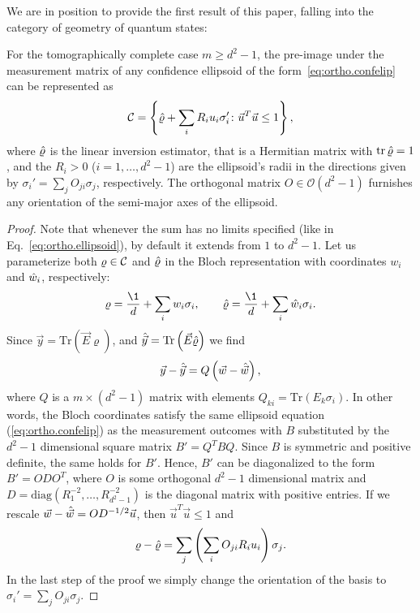 We are in position to provide the first result of this paper, falling into the category of geometry of quantum states:
\begin{theorem}\label{thm:ortho.ellipsoids}
  For the tomographically complete case $m \geq d^2 - 1$, the pre-image under the measurement matrix of any confidence ellipsoid of the form~\eqref{eq:ortho.confelip} can be represented as
  \begin{equation}
    \mathcal{C} = \left\{ \hat{\varrho} + \sum_{i}R_{i}u_{i}\sigma_{i}'\colon \vec{u}^{T}\vec{u}\leq1 \right\},
    \label{eq:ortho.ellipsoid}
  \end{equation}
  where $\hat{\varrho}$ is the linear inversion estimator, that is a Hermitian matrix with $\operatorname{tr} \hat{\varrho} = 1$, and the $R_{i}>0$ ($i=1,\ldots,d^{2}-1$) are the ellipsoid's radii in the directions given by $\sigma_{i}'=\sum_{j}O_{ji}\sigma_{j}$, respectively.
  The orthogonal matrix $O\in\mathcal{O}\left(d^{2}-1\right)$ furnishes any orientation of the semi-major axes of the ellipsoid.
\end{theorem}
\begin{proof}
  Note that whenever the sum has no limits specified (like in Eq.~\eqref{eq:ortho.ellipsoid}), by default it extends from $1$ to $d^{2}-1$.
  Let us parameterize both $\varrho \in \mathcal{C}$ and $\hat{\varrho}$ in the Bloch representation with coordinates $w_{i}$ and $\hat{w}_i$, respectively:
  \begin{equation}
    \varrho=\frac{\1}{d}+\sum_{i}w_{i}\sigma_{i},\qquad\estim{\varrho}=\frac{\1}{d}+\sum_{i}\estim{w}_{i}\sigma_{i}.
  \end{equation}
  Since $\vec{y}=\textrm{Tr}\left(\vec{E}\varrho\right)$, and $\hat{\vec{y}}=\textrm{Tr}\left(\vec{E}\hat{\varrho}\right)$ we find
  \begin{equation}
    \vec{y}-\hat{\vec{y}}=Q\left(\vec{w}-\hat{\vec{w}}\right),
  \end{equation}
  where $Q$ is a $m\times(d^{2}-1)$ matrix with elements $Q_{ki}=\textrm{Tr}\left(E_{k}\sigma_{i}\right)$.
  In other words, the Bloch coordinates satisfy the same ellipsoid equation (\ref{eq:ortho.confelip}) as the measurement outcomes with $B$ substituted by the $d^{2}-1$ dimensional square matrix $B'=Q^{T}BQ$.
  Since $B$ is symmetric and positive definite, the same holds for $B'$.
  Hence, $B'$ can be diagonalized to the form $B'=ODO^{T}$, where $O$ is some orthogonal $d^{2}-1$ dimensional matrix and $D=\textrm{diag}(R_{1}^{-2},\ldots,R_{d^{2}-1}^{-2})$ is the diagonal matrix with positive entries.
  If we rescale $\vec{w}-\hat{\vec{w}}=OD^{-1/2}\vec{u}$, then $\vec{u}^{T}\vec{u}\leq1$ and
  \begin{equation}
    \varrho-\hat{\varrho}=\sum_{j}\left(\sum_{i}O_{ji}R_{i}u_{i}\right)\sigma_{j}.
  \end{equation}
  In the last step of the proof we simply change the orientation of the basis to $\sigma_{i}'=\sum_{j}O_{ji}\sigma_{j}$.
\end{proof}


